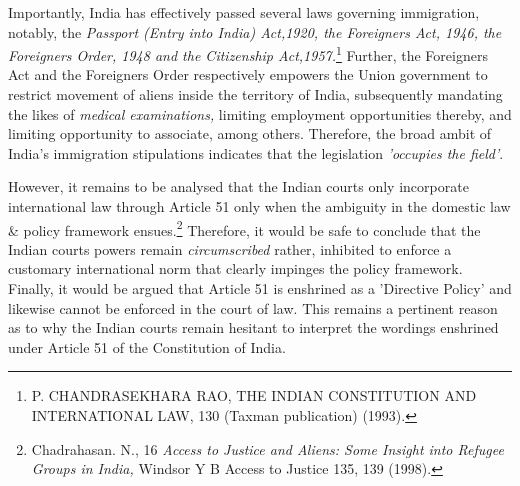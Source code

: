 \begin{multicols}{2}
\noi
Importantly, India has effectively passed several laws governing immigration, notably, the
\textit{Passport (Entry into India) Act,1920, the Foreigners Act, 1946, the Foreigners Order, 1948
and the Citizenship Act,1957.}\footnote{P. CHANDRASEKHARA RAO, THE INDIAN CONSTITUTION AND INTERNATIONAL LAW, 130 (Taxman publication) (1993).} Further, the Foreigners Act and the Foreigners Order
respectively empowers the Union government to restrict movement of aliens inside the
territory of India, subsequently mandating the likes of \textit{medical examinations,} limiting
employment opportunities thereby, and limiting opportunity to associate, among others.
Therefore, the broad ambit of India's immigration stipulations indicates that the legislation
\textit{'occupies the field'}.

\vspace{-.15cm}

\noi
However, it remains to be analysed that the Indian courts only incorporate international law
through Article 51 only when the ambiguity in the domestic law \& policy framework
ensues.\footnote{Chadrahasan. N., 16 \textit{Access to Justice and Aliens: Some Insight into Refugee Groups in India,} Windsor Y B Access to Justice 135, 139 (1998).} Therefore, it would be safe to conclude that the Indian courts powers remain \textit{circumscribed} rather, inhibited to enforce a customary international norm that clearly
impinges the policy framework. Finally, it would be argued that Article 51 is enshrined as a
'Directive Policy' and likewise cannot be enforced in the court of law. This remains a
pertinent reason as to why the Indian courts remain hesitant to interpret the wordings
enshrined under Article 51 of the Constitution of India.

\vspace{-.15cm}


\vspace{-.15cm}


\end{multicols}
